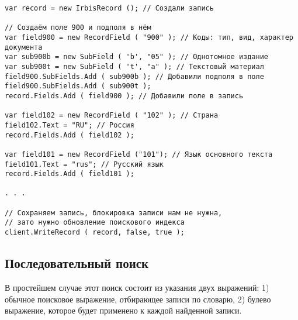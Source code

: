 \begin{lstlisting}
var record = new IrbisRecord (); // Создали запись

// Создаём поле 900 и подполя в нём
var field900 = new RecordField ( "900" ); // Коды: тип, вид, характер документа
var sub900b = new SubField ( 'b', "05" ); // Однотомное издание
var sub900t = new SubField ( 't', "a" ); // Текстовый материал
field900.SubFields.Add ( sub900b ); // Добавили подполя в поле
field900.SubFields.Add ( sub900t );
record.Fields.Add ( field900 ); // Добавили поле в запись

var field102 = new RecordField ( "102" ); // Страна
field102.Text = "RU"; // Россия
record.Fields.Add ( field102 );

var field101 = new RecordField ("101"); // Язык основного текста
field101.Text = "rus"; // Русский язык
record.Fields.Add ( field101 );

. . .

// Сохраняем запись, блокировка записи нам не нужна, 
// зато нужно обновление поискового индекса
client.WriteRecord ( record, false, true );
\end{lstlisting}

\subsection{Последовательный поиск}

В простейшем случае этот поиск состоит из указания двух выражений: 1) обычное поисковое выражение, отбирающее записи по словарю, 2) булево выражение, которое будет применено к каждой найденной записи. 

